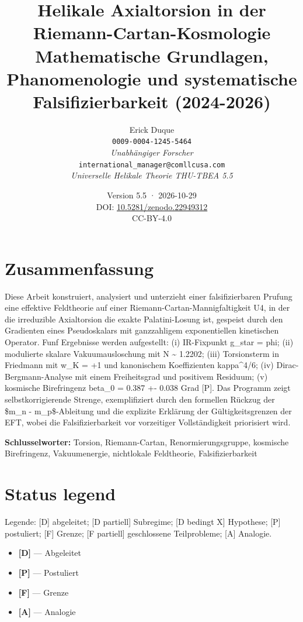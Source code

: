 ﻿\documentclass[11pt,letterpaper]{article}
\title{\textbf{Helikale Axialtorsion in der Riemann-Cartan-Kosmologie} \\[0.5em] \large Mathematische Grundlagen, Phanomenologie und systematische Falsifizierbarkeit (2024-2026)}
\author{Erick Duque \\ \texttt{0009-0004-1245-5464} \\ \textit{Unabhängiger Forscher} \\ \texttt{international\_manager@comllcusa.com} \\ \textit{Universelle Helikale Theorie THU-TBEA 5.5}}
\date{Version 5.5 · 2026-10-29 \\ \small DOI: \href{https://doi.org/10.5281/zenodo.22949312}{10.5281/zenodo.22949312} \\ \small CC-BY-4.0}
\begin{document}
\maketitle
\thispagestyle{empty}

\section*{Zusammenfassung}

Diese Arbeit konstruiert, analysiert und unterzieht einer falsifizierbaren Prufung eine effektive Feldtheorie auf einer Riemann-Cartan-Mannigfaltigkeit U4, in der die irreduzible Axialtorsion die exakte Palatini-Losung ist, gespeist durch den Gradienten eines Pseudoskalars mit ganzzahligem exponentiellen kinetischen Operator. Funf Ergebnisse werden aufgestellt: (i) IR-Fixpunkt g\_star = phi; (ii) modulierte skalare Vakuumausloschung mit N \textasciitilde{} 1.2202; (iii) Torsionsterm in Friedmann mit w\_K = +1 und kanonischem Koeffizienten kappa\textasciicircum{}4/6; (iv) Dirac-Bergmann-Analyse mit einem Freiheitsgrad und positivem Residuum; (v) kosmische Birefringenz beta\_0 = 0.387 +- 0.038 Grad [P]. Das Programm zeigt selbstkorrigierende Strenge, exemplifiziert durch den formellen Rückzug der \$m\_n - m\_p\$-Ableitung und die explizite Erklärung der Gültigkeitsgrenzen der EFT, wobei die Falsifizierbarkeit vor vorzeitiger Vollständigkeit priorisiert wird.

\vspace{1em}
\textbf{Schlusselworter:} Torsion, Riemann-Cartan, Renormierungsgruppe, kosmische Birefringenz, Vakuumenergie, nichtlokale Feldtheorie, Falsifizierbarkeit

\newpage
\tableofcontents
\newpage

\section*{Status legend}
Legende: [D] abgeleitet; [D partiell] Subregime; [D bedingt X] Hypothese; [P] postuliert; [F] Grenze; [F partiell] geschlossene Teilprobleme; [A] Analogie.

\vspace{0.5em}
\begin{itemize}[leftmargin=*]
\item \textcolor{Dgreen}{\textbf{[D]}} — Abgeleitet
\item \textcolor{Ppurple}{\textbf{[P]}} — Postuliert
\item \textcolor{Forange}{\textbf{[F]}} — Grenze
\item \textcolor{Ayellow}{\textbf{[A]}} — Analogie
\end{itemize}
\end{document}
